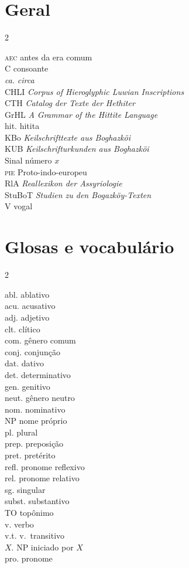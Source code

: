 \newcommand{\abreviacao}[2]{\noindent #1 \hspace{10pt}\hfill #2\\}
\newenvironment{abreviacoes}{
	\flushright%
	\setlength{\columnsep}{50pt}
	\small
	\begin{multicols}{2}
		}{
	\end{multicols}
}

\section*{Geral}
\begin{abreviacoes}
	\abreviacao{\textsc{aec}}{antes da era comum}
	\abreviacao{C}{consoante}
	\abreviacao{\emph{ca.}}{\emph{circa}}
	\abreviacao{CHLI}{\emph{\foreignlanguage{english}{Corpus of Hieroglyphic Luwian Inscriptions}}}
	\abreviacao{CTH}{\emph{\foreignlanguage{german}{Catalog der Texte der Hethiter}}}
	\abreviacao{GrHL}{\emph{\foreignlanguage{english}{A Grammar of the Hittite Language}}}
	\abreviacao{hit.}{hitita}
	\abreviacao{KBo}{\emph{\foreignlanguage{german}{Keilschrifttexte aus Boghazköi}}}
	\abreviacao{KUB}{\emph{\foreignlanguage{german}{Keilschrifturkunden aus Boghazköi}}}
	\abreviacao{}{Sinal número $x$}
	\abreviacao{\textsc{pie}}{Proto-indo-europeu}
	\abreviacao{RlA}{\emph{\foreignlanguage{german}{Reallexikon der Assyriologie}}}
	\abreviacao{StuBoT}{\emph{\foreignlanguage{german}{Studien zu den
				Bogazköy-Texten}}}
	\abreviacao{V}{vogal}
\end{abreviacoes}


\section*{Glosas e vocabulário}
\begin{abreviacoes}
	\abreviacao{abl.}{ablativo}
	\abreviacao{acu.}{acusativo}
	\abreviacao{adj.}{adjetivo}
	\abreviacao{clt.}{clítico}
	\abreviacao{com.}{gênero comum}
	\abreviacao{conj.}{conjunção}
	\abreviacao{dat.}{dativo}
	\abreviacao{det.}{determinativo}
	\abreviacao{gen.}{genitivo}
	\abreviacao{neut.}{gênero neutro}
	\abreviacao{nom.}{nominativo}
	\abreviacao{NP}{nome próprio}
	\abreviacao{pl.}{plural}
	\abreviacao{prep.}{preposição}
	\abreviacao{pret.}{pretérito}
	\abreviacao{refl.}{pronome reflexivo}
	\abreviacao{rel.}{pronome relativo}
	\abreviacao{sg.}{singular}
	\abreviacao{subst.}{substantivo}
	\abreviacao{TO}{topônimo}
	\abreviacao{v.}{verbo}
	\abreviacao{v.t.}{v.\ transitivo}
	\abreviacao{$X$.}{NP iniciado por $X$}
	\abreviacao{pro.}{pronome}
\end{abreviacoes}
